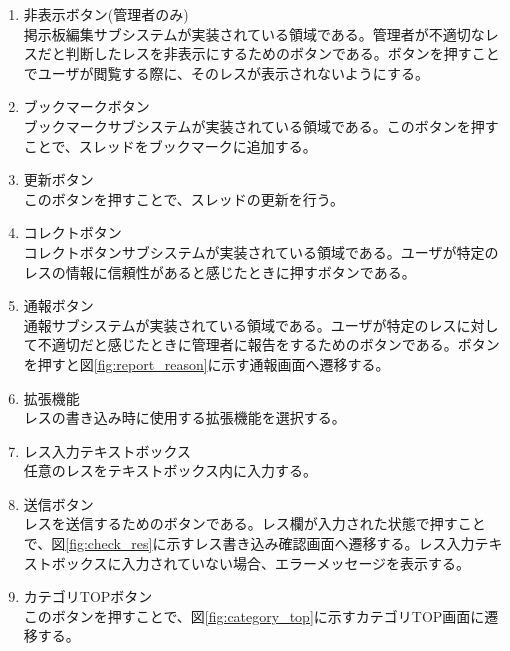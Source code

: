 \documentclass[a4j]{jarticle}
\begin{document}
\begin{enumerate}
  \renewcommand{\labelenumi}{\textcircled{\scriptsize \theenumi}}
\item 非表示ボタン(管理者のみ)\\
  掲示板編集サブシステムが実装されている領域である。管理者が不適切なレスだと判断したレスを非表示にするためのボタンである。ボタンを押すことでユーザが閲覧する際に、そのレスが表示されないようにする。

\item ブックマークボタン\\
  ブックマークサブシステムが実装されている領域である。このボタンを押すことで、スレッドをブックマークに追加する。

\item 更新ボタン\\
  このボタンを押すことで、スレッドの更新を行う。

\item コレクトボタン\\
  コレクトボタンサブシステムが実装されている領域である。ユーザが特定のレスの情報に信頼性があると感じたときに押すボタンである。

\item 通報ボタン\\
  通報サブシステムが実装されている領域である。ユーザが特定のレスに対して不適切だと感じたときに管理者に報告をするためのボタンである。ボタンを押すと図\ref{fig:report_reason}に示す通報画面へ遷移する。

\item 拡張機能\\
  レスの書き込み時に使用する拡張機能を選択する。

\item レス入力テキストボックス\\
  任意のレスをテキストボックス内に入力する。

\item 送信ボタン\\
  レスを送信するためのボタンである。レス欄が入力された状態で押すことで、図\ref{fig:check_res}に示すレス書き込み確認画面へ遷移する。レス入力テキストボックスに入力されていない場合、エラーメッセージを表示する。

\item カテゴリTOPボタン\\
  このボタンを押すことで、図\ref{fig:category_top}に示すカテゴリTOP画面に遷移する。

\end{enumerate}
\end{document}
